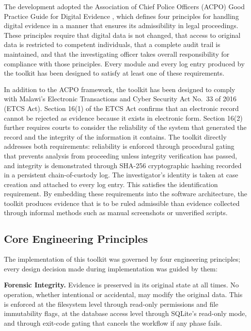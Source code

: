 \documentclass[12pt,a4paper]{report}
\begin{document}
The development adopted the Association of Chief Police Officers (ACPO) Good Practice Guide for Digital Evidence \citep{acpo2012}, which defines four principles for handling digital evidence in a manner that ensures its admissibility in legal proceedings. These principles require that digital data is not changed, that access to original data is restricted to competent individuals, that a complete audit trail is maintained, and that the investigating officer takes overall responsibility for compliance with those principles. Every module and every log entry produced by the toolkit has been designed to satisfy at least one of these requirements.

In addition to the ACPO framework, the toolkit has been designed to comply with Malawi's Electronic Transactions and Cyber Security Act No.\ 33 of 2016 (ETCS Act). Section 16(1) of the ETCS Act confirms that an electronic record cannot be rejected as evidence because it exists in electronic form. Section 16(2) further requires courts to consider the reliability of the system that generated the record and the integrity of the information it contains. The toolkit directly addresses both requirements: reliability is enforced through procedural gating that prevents analysis from proceeding unless integrity verification has passed, and integrity is demonstrated through SHA-256 cryptographic hashing recorded in a persistent chain-of-custody log. The investigator's identity is taken at case creation and attached to every log entry. This satisfies the identification requirement. By embedding these requirements into the software architecture, the toolkit produces evidence that is to be ruled admissible than evidence collected through informal methods such as manual screenshots or unverified scripts.

\subsection{Core Engineering Principles}

The implementation of this toolkit was governed by four engineering principles; every design decision made during implementation was guided by them:

\textbf{Forensic Integrity.} Evidence is preserved in its original state at all times. No operation, whether intentional or accidental, may modify the original data. This is enforced at the filesystem level through read-only permissions and file immutability flags, at the database access level through SQLite's read-only mode, and through exit-code gating that cancels the workflow if any phase fails.
\end{document}
